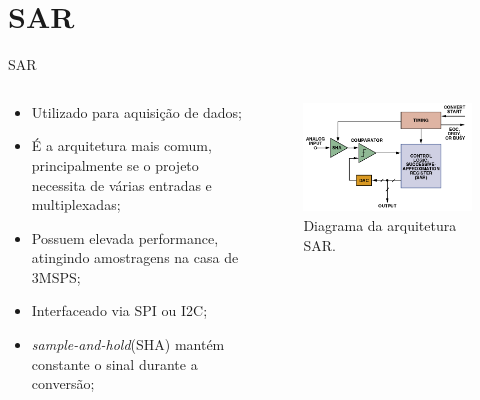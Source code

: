 \documentclass{beamer}
\begin{document}

\section{SAR}

\begin{frame}{SAR}
\begin{columns}
    \begin{column}{0.50\textwidth}
		\begin{itemize}
			\item Utilizado para aquisição de dados;
			\item É a arquitetura mais comum, principalmente se o projeto necessita de várias entradas e multiplexadas;
			\item Possuem elevada performance, atingindo amostragens na casa de 3MSPS;
			\item Interfaceado via SPI ou I2C;
			\item \textit{sample-and-hold}(SHA) mantém constante o sinal durante a conversão;
		\end{itemize}
    \end{column}

    \begin{column}{0.5\textwidth}
		\begin{figure}[H]
		    \centering
		    \begin{center}
		    \includegraphics[width=\textwidth]{img/sar}
		  \caption{Diagrama da arquitetura SAR.}
		    \label{fig:sar}
		  \end{center}
		\end{figure}
    \end{column}
\end{columns}
\end{frame}
\end{document}
